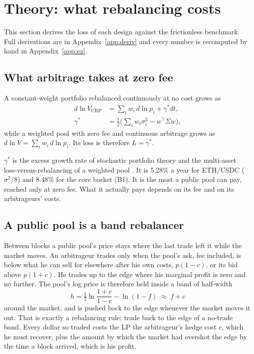 \section{Theory: what rebalancing costs}
\label{sec:theory}

This section derives the loss of each design against the frictionless benchmark. Full derivations are in Appendix~\ref{app:deriv} and every number is recomputed by hand in Appendix~\ref{app:ex}.

\subsection{What arbitrage takes at zero fee}

\begin{prop}\label{prop:gamma}
A constant-weight portfolio rebalanced continuously at no cost grows as
\begin{equation}
\begin{aligned}
d\ln V_{\mathrm{CRP}}&=\sum_i w_i\,d\ln p_i+\gamma^{*}dt,\\
\gamma^{*}&=\tfrac12\Big(\sum_i w_i\sigma_i^2-w^{\top}\Sigma w\Big),
\end{aligned}
\label{eq:gamma}
\end{equation}
while a weighted pool with zero fee and continuous arbitrage grows as $d\ln V=\sum_i w_i\,d\ln p_i$. Its loss is therefore $L=\gamma^{*}$.
\end{prop}

$\gamma^{*}$ is the excess growth rate of stochastic portfolio theory \cite{fernholz} and the multi-asset loss-versus-rebalancing of a weighted pool \cite{lvr,evans}. It is 5.28\% a year for ETH/USDC ($\sigma^2/8$) and 8.48\% for the core basket (B1). It is the most a public pool can pay, reached only at zero fee. What it actually pays depends on its fee and on its arbitrageurs' costs.

\subsection{A public pool is a band rebalancer}
\label{sec:pub}

Between blocks a public pool's price stays where the last trade left it while the market moves. An arbitrageur trades only when the pool's ask, fee included, is below what he can sell for elsewhere after his own costs, $p(1-c)$, or its bid above $p(1+c)$. He trades up to the edge where his marginal profit is zero and no further. The pool's log price is therefore held inside a band of half-width
\begin{equation}
h=\tfrac12\ln\frac{1+c}{1-c}-\ln(1-f)\;\approx\;f+c
\label{eq:h}
\end{equation}
around the market, and is pushed back to the edge whenever the market moves it out. That is exactly a rebalancing rule: trade back to the edge of a no-trade band. Every dollar so traded costs the LP the arbitrageur's hedge cost $c$, which he must recover, plus the amount by which the market had overshot the edge by the time a block arrived, which is his profit.

